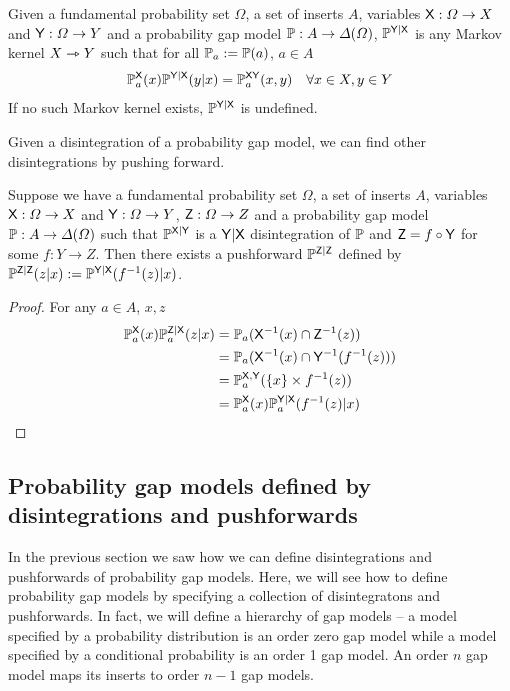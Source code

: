 \begin{definition}
Given a fundamental probability set $\Omega$, a set of inserts $A$, variables $\mathsf{X}:\Omega\to X$ and $\mathsf{Y}:\Omega\to Y$ and a probability gap model $\mathbb{P}:A\to \Delta(\Omega)$, $\mathbb{P}^{\mathsf{Y}|\mathsf{X}}$ is any Markov kernel $X\rightarrowtriangle Y$ such that for all $\mathbb{P}_a:=\mathbb{P}(a)$, $a\in A$
\begin{align}
	\mathbb{P}_a^{\mathsf{X}}(x)\mathbb{P}^{\mathsf{Y}|\mathsf{X}}(y|x)&= \mathbb{P}_a^{\mathsf{XY}}(x,y) &\forall x\in X, y\in Y
\end{align}
If no such Markov kernel exists, $\mathbb{P}^{\mathsf{Y}|\mathsf{X}}$ is undefined.
\end{definition}

Given a disintegration of a probability gap model, we can find other disintegrations by pushing forward.

\begin{theorem}\label{th:recurs_pushf}
Suppose we have a fundamental probability set $\Omega$, a set of inserts $A$, variables $\mathsf{X}:\Omega\to X$ and $\mathsf{Y}:\Omega\to Y$, $\mathsf{Z}:\Omega\to Z$ and a probability gap model $\mathbb{P}:A\to \Delta(\Omega)$ such that $\mathbb{P}^{\mathsf{X}|\mathsf{Y}}$ is a $\mathsf{Y}|\mathsf{X}$ disintegration of $\mathbb{P}$ and $\mathsf{Z}=f\circ \mathsf{Y}$ for some $f:Y\to Z$. Then there exists a pushforward $\mathbb{P}^{\mathsf{Z}|\mathsf{Z}}$ defined by $\mathbb{P}^{\mathsf{Z}|\mathsf{Z}}(z|x):=\mathbb{P}^{\mathsf{Y}|\mathsf{X}}(f^{-1}(z)|x)$.
\end{theorem}

\begin{proof}
For any $a\in A$, $x,z$
\begin{align}
\mathbb{P}_a^{\mathsf{X}}(x)\mathbb{P}_a^{\mathsf{Z}|\mathsf{X}}(z|x) &= \mathbb{P}_a(\mathsf{X}^{-1}(x)\cap\mathsf{Z}^{-1}(z))\\
					   &= \mathbb{P}_a(\mathsf{X}^{-1}(x)\cap\mathsf{Y}^{-1}(f^{-1}(z)))\\
					   &= \mathbb{P}_a^{\mathsf{X},\mathsf{Y}}(\{x\}\times f^{-1}(z))\\
					   &= \mathbb{P}_a^{\mathsf{X}}(x)\mathbb{P}_a^{\mathsf{Y}|\mathsf{X}}(f^{-1}(z)|x)
\end{align}
\end{proof}

\subsection{Probability gap models defined by disintegrations and pushforwards}

In the previous section we saw how we can define disintegrations and pushforwards of probability gap models. Here, we will see how to define probability gap models by specifying a collection of disintegratons and pushforwards. In fact, we will define a hierarchy of gap models -- a model specified by a probability distribution is an order zero gap model while a model specified by a conditional probability is an order 1 gap model. An order $n$ gap model maps its inserts to order $n-1$ gap models. 

